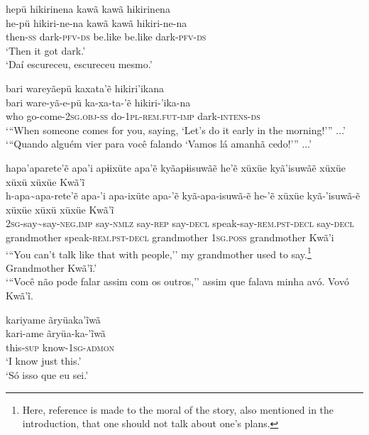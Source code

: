 \documentclass[output=paper,
modfonts,nonflat
]{langsci/langscibook}
\begin{document}
\ea     hepü hikirinena kawã kawã hikirinena \\[.3em]
\gll 	he-pü hikiri-ne-na kawã kawã hikiri-ne-na \\
then-\textsc{ss} dark-\textsc{pfv-ds} be.like be.like dark-\textsc{pfv-ds}\\
\glt    `Then it got dark.'\\
`Daí escureceu, escureceu mesmo.'\\
\z

\ea     bari wareyãepü kaxata'ẽ hikiri'ikana \\[.3em]
\gll 	bari ware-yã-e-pü ka-xa-ta-'ẽ hikiri-'ika-na\\
who go-come-\textsc{2sg.obj-ss} do-\textsc{1pl-rem.fut-imp} dark-\textsc{intens-ds}\\
\glt   `{``}When someone comes for you, saying, ‘Let's do it early in the morning!'{''} ...' \\
`{``}Quando alguém vier para você falando ‘Vamos lá amanhã cedo!'{''} ...'
\z

\ea   hapa'aparete'ẽ apa'i apɨixüte apa'ẽ kyãapɨisuwãẽ he'ẽ xüxüe kyã'isuwãẽ xüxüe xüxü xüxüe Kwã'ĩ \\[.3em]
\gll 	h-apa\textasciitilde apa-rete'ẽ apa-'i apa-ixüte apa-'ẽ kyã-apa-isuwã-ẽ he-'ẽ xüxüe kyã-'isuwã-ẽ xüxüe xüxü xüxüe Kwã'ĩ \\
\textsc{2sg}-say\textasciitilde say-\textsc{neg.imp} say-\textsc{nmlz} say-\textsc{rep}	say-\textsc{decl} speak-say-\textsc{rem.pst-decl} say-\textsc{decl} grandmother speak-\textsc{rem.pst-decl} grandmother \textsc{1sg.poss} grandmother Kwã'i\\
\glt   `{``}You can't talk like that with people,'' my grandmother used to say.\footnote{Here, reference is made to the moral of the story, also mentioned in the introduction, that one should not talk about one's plans.} Grandmother Kwã'ĩ.' \\
`{``}Você não pode falar assim com os outros,'' assim que falava minha avó. Vovó Kwã'ĩ.
\z

\ea   kariyame ãryüaka'ĩwã  \\[.3em]
\gll 	kari-ame ãryüa-ka-'ĩwã  \\
this-\textsc{sup} know-\textsc{1sg-admon} \\
\glt  `I know just this.' \\
`Só isso que eu sei.' \\
\z
 
\end{document}
